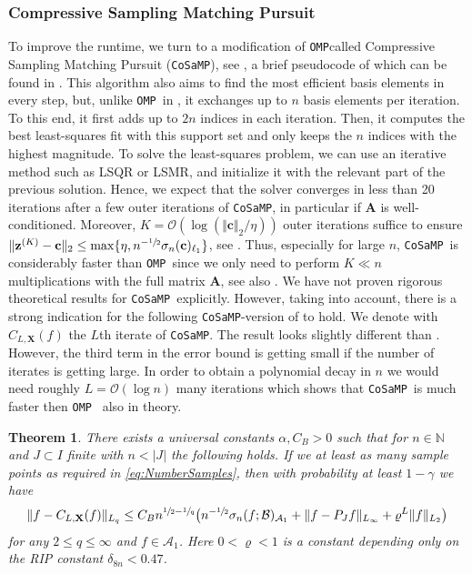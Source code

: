 \documentclass[11pt,reqno, a4paper]{article}
\numberwithin{equation}{section}
\newtheorem{theorem}{Theorem}[section]
\newcommand{\omp}{\texttt{OMP}}
\newcommand{\cosamp}{\texttt{CoSaMP}}
\begin{document}
\subsubsection{Compressive Sampling Matching Pursuit}

To improve the runtime, we turn to a modification of \omp called Compressive Sampling Matching Pursuit (\cosamp), see \cite{NeeTr09}, a brief pseudocode of which can be found in .
This algorithm also aims to find the most efficient basis elements in every step, but, unlike \omp \ in , it exchanges up to $n$ basis elements per iteration.
To this end, it first adds up to $2n$ indices in each iteration.
Then, it computes the best least-squares fit with this support set and only keeps the $n$ indices with the highest magnitude.
To solve the least-squares problem, we can use an iterative method such as LSQR or LSMR, and initialize it with the relevant part of the previous solution.
Hence, we expect that the solver converges in less than 20 iterations after a few 
outer iterations of \cosamp, in particular if $\mathbf A$ is well-conditioned.
Moreover, $K = \mathcal O(\log(\Vert \mathbf c \Vert_2 / \eta))$ outer iterations suffice to ensure $\Vert \mathbf z^{(K)} -  \mathbf c \Vert_2\leq \max \{\eta, n^{-\sfrac{1}{2}} \sigma_n(\mathbf c)_{\ell_1}\}$, see \cite[Thm.\ A]{NeeTr09}.
Thus, especially for large $n$, \cosamp \ is considerably faster than \omp \ since we only need to perform $K \ll n$ multiplications with the full matrix $\mathbf A$, see also \cite[Tab.\ 2]{NeeTr09}.
We have not proven rigorous theoretical results for \cosamp \ explicitly. However, taking \cite[Thm.\ 6.28]{FoRa13} into account, there is a strong indication for the following \cosamp-version of  to hold. We denote with $C_{L,\mathbf{X}}(f)$ the $L$th iterate of \cosamp. The result looks slightly different than . However, the third term in the error bound is getting small if the number of iterates is getting large. In order to obtain a polynomial decay in $n$ we would need roughly $L = \mathcal{O}(\log n)$ many iterations which shows that \cosamp\ is much faster then \omp~ also in theory. 

\begin{theorem}\label{thm:Error_Recovery_Cosamp}
There exists a universal constants $\alpha, C_B>0$ such that for $n \in \mathbb{N}$ and $J\subset I$ finite with $n<\lvert J\rvert$ the following holds.
If we at least as many sample points  as required in \eqref{eq:NumberSamples}, then with probability at least $1-\gamma$ we have
\begin{gather}
	\lVert f - C_{L,\mathbf{X}}(f)\rVert_{L_q} \leq C_B n^{\sfrac{1}{2}-\sfrac{1}{q}} \bigl(n^{-\sfrac{1}{2}} \sigma_n(f;\mathcal{B})_{\mathcal{A}_1} + \lVert f-P_Jf\rVert_{L_\infty} + \varrho^L\lVert f\rVert_{L_2}\bigr)
\end{gather}
for any $2\leq q\leq \infty$ and $f \in \mathcal{A}_1$. Here $0<\varrho<1$ is a constant depending only on the RIP constant $\delta_{8n}<0.47$.
\end{theorem}
\end{document}
